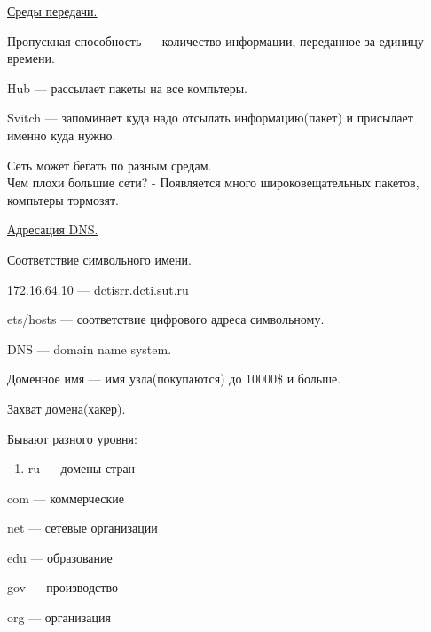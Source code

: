 \par 


\par 


\par 


\par 


\par 


\par 
\underline{Среды передачи.}
\par 
Пропускная способность —
количество информации, переданное за
единицу времени.
\par 
Hub — рассылает пакеты на все
компьтеры.
\par 
Svitch — запоминает куда надо
отсылать информацию(пакет) и присылает
именно куда нужно.
\par 
Сеть может бегать по разным
средам.\\Чем плохи большие сети? -
Появляется много широковещательных
пакетов, компьтеры тормозят.
\par 


\par 
\underline{Адресация DNS.}
\par 
Соответствие символьного имени.
\par 172.16.64.10
— dctisrr.\underline{dcti.sut.ru}
\par 
ets/hosts — соответствие цифрового
адреса символьному.
\par 
DNS — domain name system.
\par 
Доменное имя — имя узла(покупаются)
до 10000\$ и больше.
\par 
Захват домена(хакер).
\par 
Бывают разного уровня:
\begin{enumerate}
	\item \par 
	ru — домены стран
\end{enumerate}
\par 
com — коммерческие
\par 
net — сетевые организации
\par 
edu — образование 

\par 
gov — производство 

\par 
org — организация 

